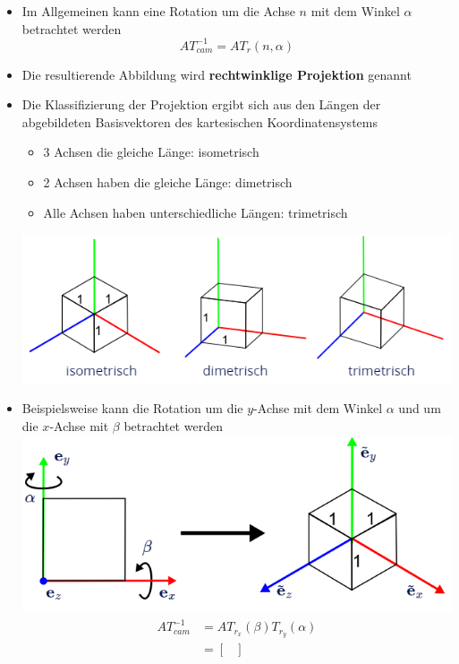 \documentclass{scrartcl}
\begin{document}
\begin{itemize}
	\item Im Allgemeinen kann eine Rotation um die Achse $n$ mit dem Winkel $\alpha$ betrachtet werden
	\begin{equation}
		AT_{cam}^{-1} = AT_r (n, \alpha)
	\end{equation}
	\item Die resultierende Abbildung wird \textbf{rechtwinklige Projektion} genannt
	\item Die Klassifizierung der Projektion ergibt sich aus den Längen der abgebildeten Basisvektoren des kartesischen Koordinatensystems
	\begin{itemize}
		\item 3 Achsen die gleiche Länge: isometrisch
		\item 2 Achsen haben die gleiche Länge: dimetrisch
		\item Alle Achsen haben unterschiedliche Längen: trimetrisch
	\end{itemize}
	\includegraphics[scale=0.5]{figures/axonometic.png}
	\item Beispielsweise kann die Rotation um die $y$-Achse mit dem Winkel $\alpha$ und um die $x$-Achse mit $\beta$ betrachtet werden \\
	\includegraphics[scale=0.5]{figures/axonometic_ab.png}
	\begin{equation}
		\begin{split}
			AT_{cam}^{-1} &= AT_{r_x} (\beta) T_{r_y} (\alpha) \\
			&= \begin{bmatrix}

\end{bmatrix}
\end{split}
\end{equation}
\end{itemize}
\end{document}
